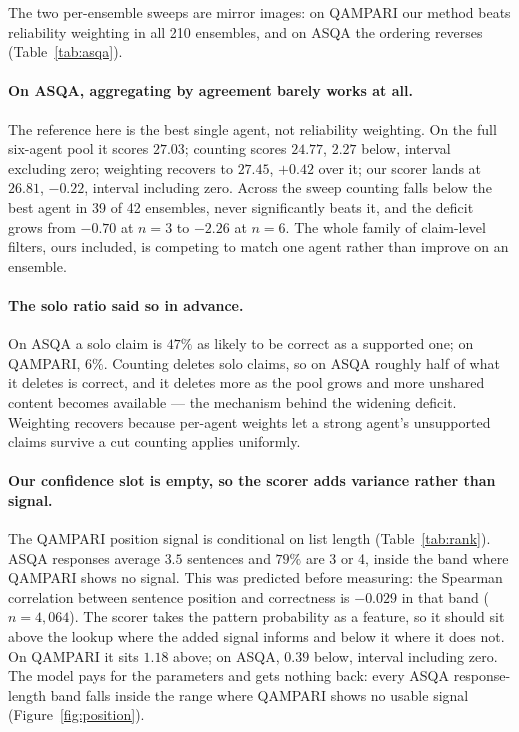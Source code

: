 \documentclass{article}
\begin{document}


The two per-ensemble sweeps are mirror images: on QAMPARI our method beats reliability weighting in all 210 ensembles, and on ASQA the ordering reverses (Table~\ref{tab:asqa}).




\paragraph{On ASQA, aggregating by agreement barely works at all.}
The reference here is the best single agent, not reliability weighting. On the full six-agent pool it scores $27.03$; counting scores $24.77$, $2.27$ below, interval excluding zero; weighting recovers to $27.45$, $+0.42$ over it; our scorer lands at $26.81$, $-0.22$, interval including zero. Across the sweep counting falls below the best agent in 39 of 42 ensembles, never significantly beats it, and the deficit grows from $-0.70$ at $n=3$ to $-2.26$ at $n=6$.
The whole family of claim-level filters, ours included, is competing to match one agent rather than improve on an ensemble.

\paragraph{The solo ratio said so in advance.}
On ASQA a solo claim is $47\%$ as likely to be correct as a supported one; on QAMPARI, $6\%$. Counting deletes solo claims, so on ASQA roughly half of what it deletes is correct, and it deletes more as the pool grows and more unshared content becomes available --- the mechanism behind the widening deficit. Weighting recovers because per-agent weights let a strong agent's unsupported claims survive a cut counting applies uniformly.

\paragraph{Our confidence slot is empty, so the scorer adds variance rather than signal.}
The QAMPARI position signal is conditional on list length (Table~\ref{tab:rank}). %
ASQA responses average $3.5$ sentences and $79\%$ are 3 or 4, inside the band where QAMPARI shows no signal. This was predicted before measuring: the Spearman correlation between sentence position and correctness is $-0.029$ in that band ($n=4{,}064$). %
The scorer takes the pattern probability as a feature, so it should sit above the lookup where the added signal informs and below it where it does not. On QAMPARI it sits $1.18$ above; on ASQA, $0.39$ below, interval including zero.
The model pays for the parameters and gets nothing back: every ASQA response-length band falls inside the range where QAMPARI shows no usable signal (Figure~\ref{fig:position}).
\end{document}
